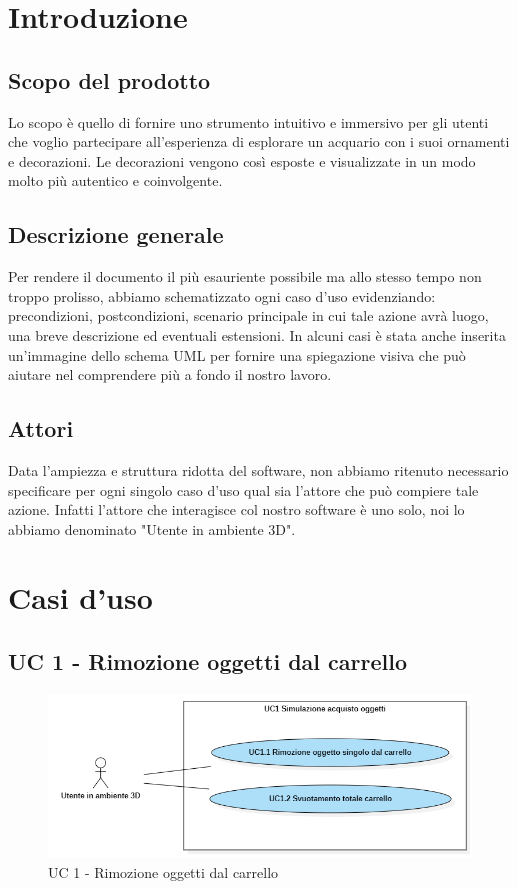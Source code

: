 \section{Introduzione}
\subsection{Scopo del prodotto}
Lo scopo è quello di fornire uno strumento intuitivo e immersivo per gli utenti che voglio partecipare all'esperienza di esplorare un acquario con i suoi ornamenti e decorazioni.
\newline
Le decorazioni vengono così esposte e visualizzate in un modo molto più autentico e coinvolgente.

\subsection{Descrizione generale}
Per rendere il documento il più esauriente possibile ma allo stesso tempo non troppo prolisso, abbiamo schematizzato ogni caso d'uso evidenziando:  precondizioni, postcondizioni, scenario principale in cui tale azione avrà luogo, una breve descrizione ed eventuali estensioni.\newline
In alcuni casi è stata anche inserita un'immagine dello schema UML per fornire una spiegazione visiva che può aiutare nel comprendere più a fondo il nostro lavoro.

\subsection{Attori}
Data l'ampiezza e struttura ridotta del software, non abbiamo ritenuto necessario specificare per ogni singolo caso d'uso qual sia l'attore che può compiere tale azione. \newline
Infatti l'attore che interagisce col nostro software è uno solo, noi lo abbiamo denominato "Utente in ambiente 3D". 

\section{Casi d'uso}

\subsection{UC 1 - Rimozione oggetti dal carrello}

\begin{figure}[H]
  \renewcommand{\thefigure}{1}
  \includegraphics[width=\linewidth]{./res/images/UC1.png}
  \caption{UC 1 - Rimozione oggetti dal carrello}
  \label{fig:UC 1}
\end{figure}


